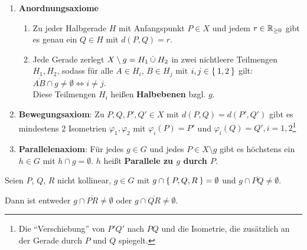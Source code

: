 \begin{definition}%
    \begin{enumerate}[label=§\arabic*),ref=§\arabic*,start=3]
        \item \label{axiom:3}\textbf{Anordnungsaxiome}
            \begin{enumerate}[label=(\roman*),ref=\theenumi{} (\roman*)]
                \item \label{axiom:3.1} Zu jeder 
                      Halbgerade $H$ mit Anfangspunkt $P \in X$ und jedem 
                      $r \in \mathbb{R}_{\geq 0}$ gibt es genau ein 
                      $Q \in H$ mit $d(P,Q) = r$.
                \item \label{axiom:3.2} Jede Gerade zerlegt 
                      $X \setminus g = H_1 \mathbin{\dot{\cup}} H_2$ in zwei 
                      nichtleere Teilmengen $H_1, H_2$,
                      sodass für alle $A \in H_i$, $B \in H_j$ mit
                      $i,j \in \Set{1,2}$ gilt: 
                      $\overline{AB} \cap g \neq \emptyset \Leftrightarrow i \neq j$.\\
                      Diese Teilmengen $H_i$ heißen 
                      \textbf{Halbebenen} bzgl. 
                      $g$.
            \end{enumerate}
        \item \label{axiom:4}\textbf{Bewegungsaxiom}: 
            Zu $P, Q, P', Q' \in X$
            mit $d(P,Q) = d(P', Q')$ gibt es mindestens 2 Isometrien $\varphi_1, \varphi_2$
            mit $\varphi_i (P) = P'$ und $\varphi_i(Q) = Q', i=1,2$\footnote{Die \enquote{Verschiebung} von $P'Q'$ nach $PQ$ und die Isometrie, die zusätzlich an der Gerade durch $P$ und $Q$ spiegelt.}
        \item \label{axiom:5}\textbf{Parallelenaxiom}:
            Für jedes $g \in G$ und jedes
            $P \in X \setminus g$ gibt es höchstens ein $h \in G$ mit
            $h \cap g = \emptyset$. $h$ heißt \textbf{Parallele zu $g$ durch $P$}.
    \end{enumerate}
\end{definition}

\begin{satz}\label{satz:pasch} %
    Seien $P$, $Q$, $R$ nicht kollinear, $g \in G$ mit $g \cap \Set{P, Q, R} = \emptyset$
    und $g \cap \overline{PQ} \neq \emptyset$. 

    Dann ist entweder $g \cap \overline{PR} \neq \emptyset$ oder 
                      $g \cap \overline{QR} \neq \emptyset$.
\end{satz}

